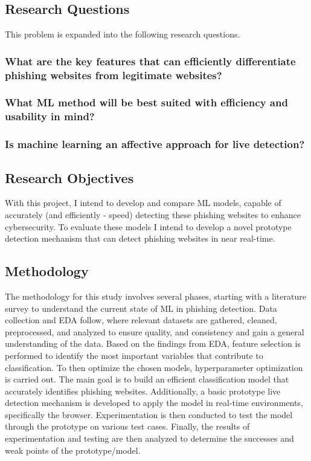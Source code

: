 \documentclass{sigkddExp}
\begin{document}
\subsection{Research Questions}
This problem is expanded into the following research questions.
\subsubsection{What are the key features that can efficiently differentiate phishing websites from legitimate websites?}
\label{rq_1}
\subsubsection{What ML method will be best suited with efficiency and usability in mind?}
\label{rq_2}
\subsubsection{Is machine learning an affective approach for live detection?}
\label{rq_3}
\subsection{Research Objectives}
\label{research_objs}
With this project, I intend to develop and compare ML models, capable of accurately (and efficiently - speed) detecting these phishing websites to enhance cybersecurity. To evaluate these models I intend to develop a novel prototype detection mechanism that can detect phishing websites in near real-time.
\subsection{Methodology}
The methodology for this study involves several phases, starting with a literature survey to understand the current state of ML in phishing detection. Data collection and EDA follow, where relevant datasets are gathered, cleaned, preprocessed, and analyzed to ensure quality, and consistency and gain a general understanding of the data. Based on the findings from EDA, feature selection is performed to identify the most important variables that contribute to classification. To then optimize the chosen models, hyperparameter optimization is carried out. The main goal is to build an efficient classification model that accurately identifies phishing websites. Additionally, a basic prototype live detection mechanism is developed to apply the model in real-time environments, specifically the browser. Experimentation is then conducted to test the model through the prototype on various test cases. Finally, the results of experimentation and testing are then analyzed to determine the successes and weak points of the prototype/model.
\end{document}
